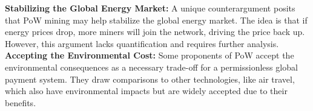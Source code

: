 \noindent
\textbf{Stabilizing the Global Energy Market:} A unique counterargument posits that PoW mining may help stabilize the global energy market. The idea is that if energy prices drop, more miners will join the network, driving the price back up. However, this argument lacks quantification and requires further analysis.\\

\noindent
\textbf{Accepting the Environmental Cost:} Some proponents of PoW accept the environmental consequences as a necessary trade-off for a permissionless global payment system. They draw comparisons to other technologies, like air travel, which also have environmental impacts but are widely accepted due to their benefits.



